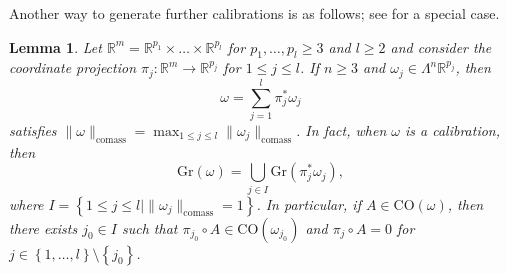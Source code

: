 \documentclass[a4paper,leqno,11pt]{amsart}
\numberwithin{equation}{section}
\newtheorem{lemma}[theorem]{Lemma}
\theoremstyle{remark}
\theoremstyle{remark}
\newcommand{\R}{\mathbb{R}}
\newcommand{\comass}{\mathrm{comass}}
\newcommand{\Gr}{\mathrm{Gr}}
\newcommand{\CO}{\mathrm{CO}}
\begin{document}
Another way to generate further calibrations is as follows; see \cite[Lemma 4.2]{Hei:Pan:Pry:23} for a special case.
\begin{lemma}\label{lemm:decompositionofcalibrations}
Let $\mathbb{R}^{m} = \mathbb{R}^{ p_1 } \times \dots \times \mathbb{R}^{ p_l }$ for $p_1, \dots, p_l \geq 3$ and $l \geq 2$ and consider the coordinate projection $\pi_j \colon \R^m \to \R^{p_j}$ for $1 \leq j \leq l$. If $n \geq 3$ and $\omega_{j} \in \Lambda^n \R^{ p_j }$, then
\begin{equation*}
    \omega = \sum_{ j = 1 }^{ l } \pi_{ j }^{*}\omega_{j}
\end{equation*}
satisfies $\|\omega\|_{\comass} = \max_{ 1 \leq j \leq l } \| \omega_j \|_{\comass}$. In fact, when $\omega$ is a calibration, then
\begin{equation*}
    \Gr( \omega ) = \bigcup_{ j \in I } \Gr( \pi_j^* \omega_j),
\end{equation*}
where $I = \left\{ 1 \leq j \leq l \mid \| \omega_j \|_{\comass} = 1 \right\}$. In particular, if $A \in \CO( \omega )$, then there exists $j_0 \in I$ such that $\pi_{ j_0 } \circ A \in \CO( \omega_{ j_0 } )$ and $\pi_j \circ A = 0$ for $j \in \left\{1,\dots,l\right\} \setminus \left\{j_0\right\}$.
\end{lemma}
\end{document}
